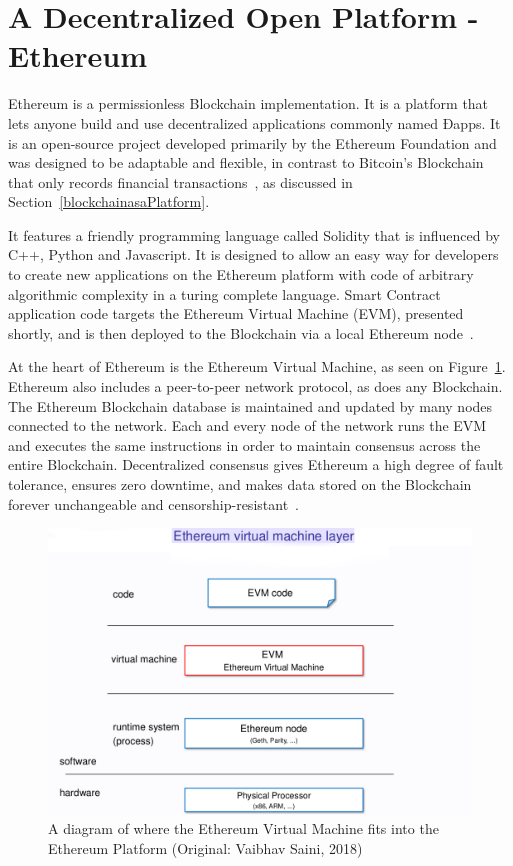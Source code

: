 \section{A Decentralized Open Platform - Ethereum} \label{ethereumPlatform}

Ethereum is a permissionless Blockchain implementation. It is a platform that
lets anyone build and use decentralized applications commonly named Ðapps. It
is an open-source project developed primarily by the Ethereum Foundation and
was designed to be adaptable and flexible, in contrast to Bitcoin's Blockchain
that only records financial transactions~\cite{EthereumDocs2018}, as discussed
in Section~\ref{blockchainasaPlatform}.

It features a friendly programming language called Solidity that is influenced
by C++, Python and Javascript. It is designed to allow an easy way for
developers to create new applications on the Ethereum platform with code of
arbitrary algorithmic complexity in a turing complete language. Smart Contract
application code targets the Ethereum Virtual Machine (EVM), presented shortly,
and is then deployed to the Blockchain via a local Ethereum
node~\cite{Wood2017,Barclay2017}.

At the heart of Ethereum is the Ethereum Virtual Machine, as seen on
Figure~\ref{fig:evm}. Ethereum also includes a peer-to-peer network protocol,
as does any Blockchain. The Ethereum Blockchain database is maintained and
updated by many nodes connected to the network. Each and every node of the
network runs the EVM and executes the same instructions in order to maintain
consensus across the entire Blockchain. Decentralized consensus gives Ethereum
a high degree of fault tolerance, ensures zero downtime, and makes data stored
on the Blockchain forever unchangeable and
censorship-resistant~\cite{EthereumDocs2018}.

\begin{figure}[h]
  \centering
  \includegraphics[width=1\linewidth]{imgs/ethereumVirtualMachine.png}
  \caption{\label{fig:evm} A diagram of where the Ethereum Virtual Machine fits
  into the Ethereum Platform (Original: Vaibhav Saini, 2018)}
\end{figure}

